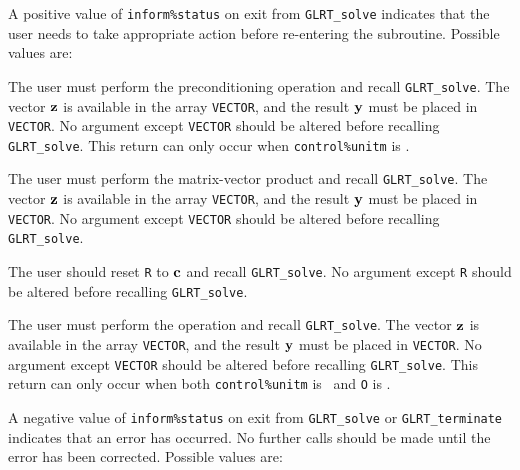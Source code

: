 \documentclass{galahad}
\newcommand{\packagename}{GL\-RT}
\begin{document}

\galreverse
A positive value of {\tt inform\%status} on exit from
{\tt \packagename\_solve} indicates that the user needs to take appropriate
action before re-entering the subroutine. Possible values are:

\begin{description}

 The user must perform the preconditioning operation
and recall {\tt \packagename\_solve}.
The vector ${\mathbf{z}}$ is available in the array {\tt VECTOR}, and the result
${\mathbf{y}}$ must be placed in {\tt VECTOR}.
No argument except {\tt VECTOR} should be altered before recalling
{\tt \packagename\_solve}. This return can only occur when
{\tt control\%unitm} is \false.

 The user must perform the matrix-vector product
\disp{\bmy := \bmH \bmz}
and recall {\tt \packagename\_solve}.
The vector ${\mathbf{z}}$ is available in the array {\tt VECTOR}, and the result
${\mathbf{y}}$ must be placed in {\tt VECTOR}.
No argument except {\tt VECTOR} should be altered before recalling
{\tt \packagename\_solve}.

  The user should reset {\tt R} to ${\mathbf{c}}$ and recall
{\tt \packagename\_solve}.
No argument except {\tt R} should be altered before recalling
{\tt \packagename\_solve}.

 The user must perform the operation
\disp{\bmy := \bmM \bmz,}
and recall {\tt \packagename\_solve}.
The vector ${\mathbf{z}}$ is available in the array {\tt VECTOR}, and the result
${\mathbf{y}}$ must be placed in {\tt VECTOR}.
No argument except {\tt VECTOR} should be altered before recalling
{\tt \packagename\_solve}. This return can only occur when
both {\tt control\%unitm} is \false\ and {\tt O} is \present.
\end{description}


\galerrors
A negative value of  {\tt inform\%status} on exit from
{\tt \packagename\_solve}
or
{\tt \packagename\_terminate}
indicates that an error has occurred. No further calls should be made
until the error has been corrected. Possible values are:
\end{document}
